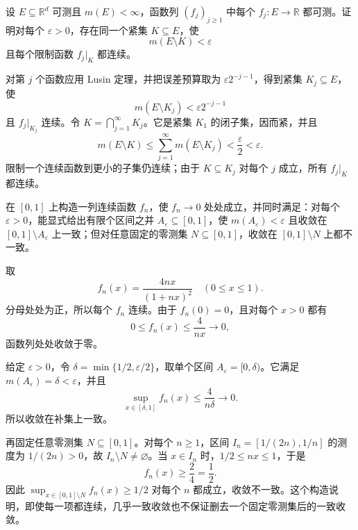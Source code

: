 \begin{exercise}\label{b1:ex:0407}
设 \(E\subseteq\mathbb R^d\) 可测且 \(m(E)<\infty\)，函数列
\((f_j)_{j\geq1}\) 中每个 \(f_j:E\rightarrow\mathbb R\) 都可测。证明对每个 \(\varepsilon>0\)，存在同一个紧集 \(K\subseteq E\)，使
\[
m(E\setminus K)<\varepsilon
\]
且每个限制函数 \(f_j|_K\) 都连续。
\end{exercise}
\begin{solution}
对第 \(j\) 个函数应用 Lusin 定理，并把误差预算取为
\(\varepsilon2^{-j-1}\)，得到紧集 \(K_j\subseteq E\)，使
\[
m(E\setminus K_j)<\varepsilon2^{-j-1}
\]
且 \(f_j|_{K_j}\) 连续。令
\(K=\bigcap_{j=1}^{\infty}K_j\)。它是紧集 \(K_1\) 的闭子集，因而紧，并且
\[
m(E\setminus K)
\leq\sum_{j=1}^{\infty}m(E\setminus K_j)
<\frac{\varepsilon}{2}<\varepsilon.
\]
限制一个连续函数到更小的子集仍连续；由于 \(K\subseteq K_j\) 对每个 \(j\) 成立，所有 \(f_j|_K\) 都连续。
\end{solution}

\begin{exercise}\label{b1:ex:0408}
在 \([0,1]\) 上构造一列连续函数 \(f_n\)，使 \(f_n\to0\) 处处成立，并同时满足：对每个 \(\varepsilon>0\)，能显式给出有限个区间之并 \(A_\varepsilon\subseteq[0,1]\)，使 \(m(A_\varepsilon)<\varepsilon\) 且收敛在 \([0,1]\setminus A_\varepsilon\) 上一致；但对任意固定的零测集 \(N\subseteq[0,1]\)，收敛在 \([0,1]\setminus N\) 上都不一致。
\end{exercise}
\begin{solution}
取
\[
f_n(x)=\frac{4nx}{(1+nx)^2}
\quad(0\leq x\leq1).
\]
分母处处为正，所以每个 \(f_n\) 连续。由于 \(f_n(0)=0\)，且对每个 \(x>0\) 都有
\[
0\leq f_n(x)\leq\frac{4}{nx}\longrightarrow0,
\]
函数列处处收敛于零。

给定 \(\varepsilon>0\)，令 \(\delta=\min\{1/2,\varepsilon/2\}\)，取单个区间 \(A_\varepsilon=[0,\delta)\)。它满足 \(m(A_\varepsilon)=\delta<\varepsilon\)，并且
\[
\sup_{x\in[\delta,1]}f_n(x)
\leq\frac{4}{n\delta}\longrightarrow0.
\]
所以收敛在补集上一致。

再固定任意零测集 \(N\subseteq[0,1]\)。对每个 \(n\geq1\)，区间 \(I_n=[1/(2n),1/n]\) 的测度为 \(1/(2n)>0\)，故 \(I_n\setminus N\ne\varnothing\)。当 \(x\in I_n\) 时，\(1/2\leq nx\leq1\)，于是
\[
f_n(x)\geq\frac{2}{4}=\frac12.
\]
因此 \(\sup_{x\in[0,1]\setminus N}f_n(x)\geq1/2\) 对每个 \(n\) 都成立，收敛不一致。这个构造说明，即使每一项都连续，几乎一致收敛也不保证删去一个固定零测集后的一致收敛。
\end{solution}

